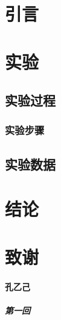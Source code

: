 \documentclass{ctexart}
\begin{document}
	
	\tableofcontents  %
	
	
	\section{引言} %
	
	\section{实验} 
	
	\subsection{实验过程} %
	
	\subsubsection{实验步骤} %
	
	\subsection{实验数据}
	
	\section{结论}
	
	\section* {致谢}
	
	\paragraph{孔乙己} %
	
	\subparagraph{第一回} %
	
\end{document}
